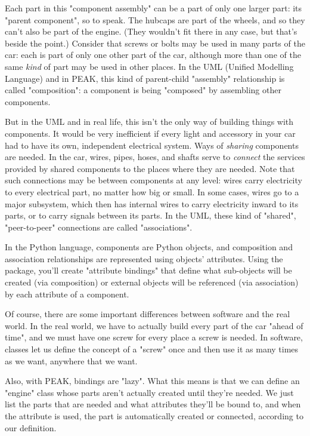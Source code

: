 Each part in this "component assembly" can be a part of only one larger part:
its "parent component", so to speak.  The hubcaps are part of the wheels,
and so they can't also be part of the engine.  (They wouldn't fit there in 
any case, but that's beside the point.)  Consider that screws or bolts may
be used in many parts of the car: each is part of only one other part of
the car, although more than one of the same \emph{kind} of part may be used
in other places.  In the UML (Unified Modelling Language) and in PEAK, this
kind of parent-child "assembly" relationship  is called "composition": a
component is being "composed" by assembling other components.

But in the UML and in real life, this isn't the only way of building things
with components.  It would be very inefficient if every light and accessory
in your car had to have its own, independent electrical system.  Ways of
\emph{sharing} components are needed.  In the car, wires, pipes, hoses, and
shafts serve to \emph{connect} the services provided by shared components to
the places where they are needed.  Note that such connections may be between
components at any level: wires carry electricity to every electrical part, no
matter how big or small.  In some cases, wires go to a major subsystem, which
then has internal wires to carry electricity inward to its parts, or to carry
signals between its parts.  In  the UML, these kind of "shared", "peer-to-peer"
connections are called "associations".

In the Python language, components are Python objects, and composition and
association relationships are represented using objects' attributes.  Using
the  package, you'll create "attribute bindings" that 
define what sub-objects will be created (via composition) or external objects 
will be referenced (via association) by each attribute of a component.

Of course, there are some important differences between software and the real
world.  In the real world, we have to actually build every part of the car
"ahead of time", and we must have one screw for every place a screw is needed.
In software, classes let us define the concept of a "screw" once and then use
it as many times as we want, anywhere that we want.

Also, with PEAK, bindings are "lazy".  What this means is that we can define
an "engine" class whose parts aren't actually created until they're needed.
We just list the parts that are needed and what attributes they'll be bound
to, and when the attribute is used, the part is automatically created or
connected, according to our definition.

